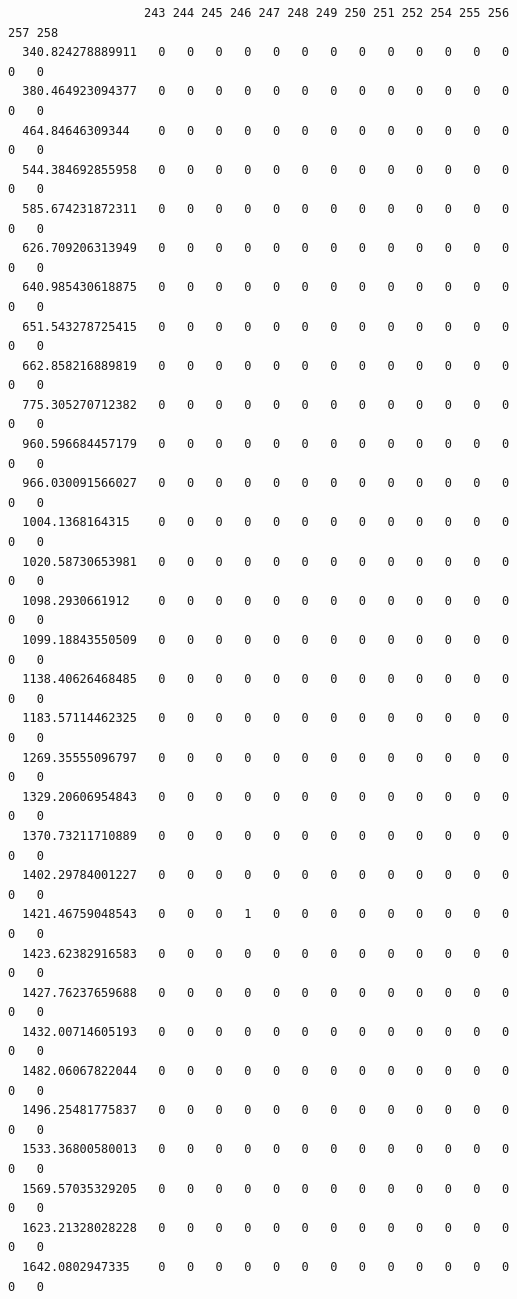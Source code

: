 \documentclass[
  letterpaper,
  DIV=11,
  numbers=noendperiod]{scrartcl}
\begin{document}
\begin{verbatim}
                   243 244 245 246 247 248 249 250 251 252 254 255 256 257 258
  340.824278889911   0   0   0   0   0   0   0   0   0   0   0   0   0   0   0
  380.464923094377   0   0   0   0   0   0   0   0   0   0   0   0   0   0   0
  464.84646309344    0   0   0   0   0   0   0   0   0   0   0   0   0   0   0
  544.384692855958   0   0   0   0   0   0   0   0   0   0   0   0   0   0   0
  585.674231872311   0   0   0   0   0   0   0   0   0   0   0   0   0   0   0
  626.709206313949   0   0   0   0   0   0   0   0   0   0   0   0   0   0   0
  640.985430618875   0   0   0   0   0   0   0   0   0   0   0   0   0   0   0
  651.543278725415   0   0   0   0   0   0   0   0   0   0   0   0   0   0   0
  662.858216889819   0   0   0   0   0   0   0   0   0   0   0   0   0   0   0
  775.305270712382   0   0   0   0   0   0   0   0   0   0   0   0   0   0   0
  960.596684457179   0   0   0   0   0   0   0   0   0   0   0   0   0   0   0
  966.030091566027   0   0   0   0   0   0   0   0   0   0   0   0   0   0   0
  1004.1368164315    0   0   0   0   0   0   0   0   0   0   0   0   0   0   0
  1020.58730653981   0   0   0   0   0   0   0   0   0   0   0   0   0   0   0
  1098.2930661912    0   0   0   0   0   0   0   0   0   0   0   0   0   0   0
  1099.18843550509   0   0   0   0   0   0   0   0   0   0   0   0   0   0   0
  1138.40626468485   0   0   0   0   0   0   0   0   0   0   0   0   0   0   0
  1183.57114462325   0   0   0   0   0   0   0   0   0   0   0   0   0   0   0
  1269.35555096797   0   0   0   0   0   0   0   0   0   0   0   0   0   0   0
  1329.20606954843   0   0   0   0   0   0   0   0   0   0   0   0   0   0   0
  1370.73211710889   0   0   0   0   0   0   0   0   0   0   0   0   0   0   0
  1402.29784001227   0   0   0   0   0   0   0   0   0   0   0   0   0   0   0
  1421.46759048543   0   0   0   1   0   0   0   0   0   0   0   0   0   0   0
  1423.62382916583   0   0   0   0   0   0   0   0   0   0   0   0   0   0   0
  1427.76237659688   0   0   0   0   0   0   0   0   0   0   0   0   0   0   0
  1432.00714605193   0   0   0   0   0   0   0   0   0   0   0   0   0   0   0
  1482.06067822044   0   0   0   0   0   0   0   0   0   0   0   0   0   0   0
  1496.25481775837   0   0   0   0   0   0   0   0   0   0   0   0   0   0   0
  1533.36800580013   0   0   0   0   0   0   0   0   0   0   0   0   0   0   0
  1569.57035329205   0   0   0   0   0   0   0   0   0   0   0   0   0   0   0
  1623.21328028228   0   0   0   0   0   0   0   0   0   0   0   0   0   0   0
  1642.0802947335    0   0   0   0   0   0   0   0   0   0   0   0   0   0   0

\end{verbatim}
\end{document}
